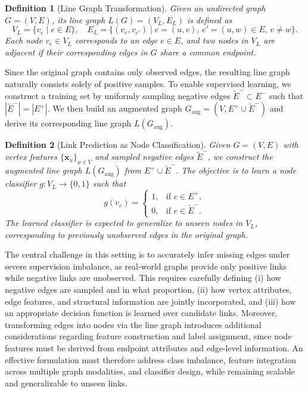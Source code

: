 \documentclass[pdflatex,sn-mathphys-num]{sn-jnl}%
\theoremstyle{thmstyleone}%
\theoremstyle{thmstyletwo}%
\theoremstyle{thmstylethree}%
\newtheorem{definition}{Definition}%
\theoremstyle{plain} %
\theoremstyle{definition} %
\theoremstyle{remark} %
\theoremstyle{plain} %
\begin{document}
\begin{definition}[Line Graph Transformation]
Given an undirected graph $G = (V, E)$, its line graph $L(G) = (V_L, E_L)$ is defined as
\[
V_L = \{ v_e \mid e \in E \}, \quad
E_L = \{ (v_e, v_{e'}) \mid e=(u,v),\, e'=(u,w) \in E,\, v \neq w \}.
\]
Each node $v_e \in V_L$ corresponds to an edge $e \in E$, and two nodes in $V_L$ are adjacent if their corresponding edges in $G$ share a common endpoint.
\end{definition}

Since the original graph contains only observed edges, the resulting line graph naturally consists solely of positive samples. To enable supervised learning, we construct a training set by uniformly sampling negative edges $\tilde{E}^- \subset E^-$ such that $|\tilde{E}^-| = |E^+|$. We then build an augmented graph $G_{\text{aug}} = (V, E^+ \cup \tilde{E}^-)$ and derive its corresponding line graph $L(G_{\text{aug}})$.

\begin{definition}[Link Prediction as Node Classification]
Given $G = (V, E)$ with vertex features $\{\mathbf{x}_u\}_{u \in V}$ and sampled negative edges $\tilde{E}^-$, we construct the augmented line graph $L(G_{\text{aug}})$ from $E^+ \cup \tilde{E}^-$. The objective is to learn a node classifier
$g: V_L \rightarrow \{0,1\}$ such that
\[
g(v_e) =
\begin{cases}
1, & \text{if } e \in E^+, \\
0, & \text{if } e \in \tilde{E}^-.
\end{cases}
\]
The learned classifier is expected to generalize to unseen nodes in $V_L$, corresponding to previously unobserved edges in the original graph.
\end{definition}

The central challenge in this setting is to accurately infer missing edges under severe supervision imbalance, as real-world graphs provide only positive links while negative links are unobserved. 
This requires carefully defining (i) how negative edges are sampled and in what proportion, 
(ii) how vertex attributes, edge features, and structural information are jointly incorporated, and 
(iii) how an appropriate decision function is learned over candidate links. 
Moreover, transforming edges into nodes via the line graph introduces additional considerations regarding feature construction and label assignment, since node features must be derived from endpoint attributes and edge-level information. 
An effective formulation must therefore address class imbalance, feature integration across multiple graph modalities, and classifier design, while remaining scalable and generalizable to unseen links.
\end{document}
